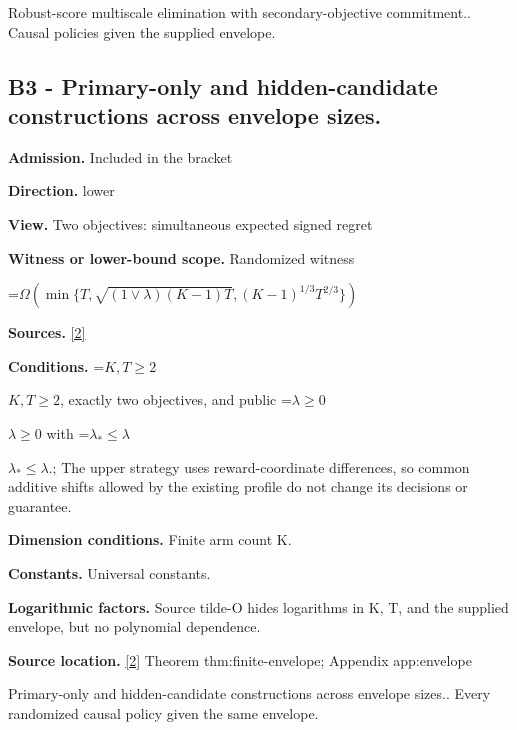 \documentclass[10pt,a4paper]{article}
\newcommand{\AtlasMath}[1]{\par\begingroup\centering\setbox0=\hbox{$\displaystyle #1$}\ifdim\wd0>1.4\linewidth\typeout{ATLAS WIDE FORMULA: \the\wd0}\fi\ifdim\wd0>\linewidth\resizebox{\linewidth}{!}{\box0}\else\box0\fi\par\endgroup}
\newcommand{\AtlasInlineMath}[1]{\begingroup\setbox0=\hbox{$#1$}\ifdim\wd0>.4\linewidth\endgroup\AtlasMath{#1}\else\endgroup$#1$\fi}
\begin{document}
Robust-score multiscale elimination with secondary-objective commitment.. Causal policies given the supplied envelope.



\subsection{B3 - Primary-only and hidden-candidate constructions across envelope sizes.}


\textbf{Admission.} Included in the bracket



\textbf{Direction.} lower



\textbf{View.} Two objectives: simultaneous expected signed regret



\textbf{Witness or lower-bound scope.} Randomized witness



\AtlasMath{\Omega\!\left(\min\{T,\sqrt{(1\vee\lambda)(K-1)T},(K-1)^{1/3}T^{2/3}\}\right)}


\textbf{Sources.} \href{https://github.com/WU-Wendao/Colombo/blob/main/colombo_sensorium/Complexity_altas/data/sources/colombo/U07/manuscript.pdf}{[2]}



\textbf{Conditions.} \AtlasInlineMath{K,T\ge2}, exactly two objectives, and public \AtlasInlineMath{\lambda\ge0} with \AtlasInlineMath{\lambda_*\le\lambda}.; The upper strategy uses reward-coordinate differences, so common additive shifts allowed by the existing profile do not change its decisions or guarantee.



\textbf{Dimension conditions.} Finite arm count K.



\textbf{Constants.} Universal constants.



\textbf{Logarithmic factors.} Source tilde-O hides logarithms in K, T, and the supplied envelope, but no polynomial dependence.



\textbf{Source location.} \href{https://github.com/WU-Wendao/Colombo/blob/main/colombo_sensorium/Complexity_altas/data/sources/colombo/U07/manuscript.pdf}{[2]} Theorem thm:finite-envelope; Appendix app:envelope



Primary-only and hidden-candidate constructions across envelope sizes.. Every randomized causal policy given the same envelope.
\end{document}
